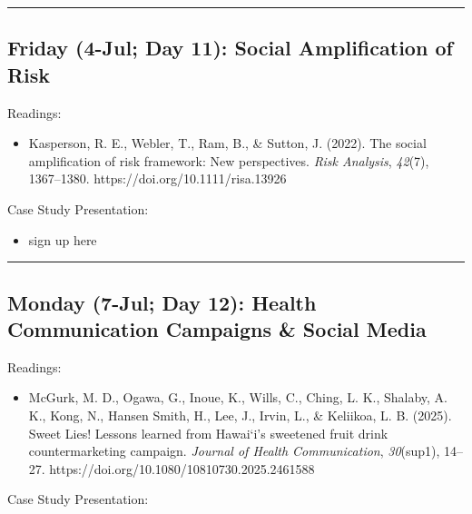 \documentclass[
  letterpaper,
]{article}
\providecommand{\tightlist}{%
  \setlength{\itemsep}{0pt}\setlength{\parskip}{0pt}}\usepackage{longtable,booktabs,array}
\begin{document}
\begin{center}\rule{0.5\linewidth}{0.5pt}\end{center}

\hypertarget{friday-4-jul-day-11-social-amplification-of-risk}{%
\subsection{Friday (4-Jul; Day 11): Social Amplification of
Risk}\label{friday-4-jul-day-11-social-amplification-of-risk}}

Readings:

\begin{itemize}
\tightlist
\item
  Kasperson, R. E., Webler, T., Ram, B., \& Sutton, J. (2022). The
  social amplification of risk framework: New perspectives. \emph{Risk
  Analysis}, \emph{42}(7), 1367--1380.
  https://doi.org/10.1111/risa.13926
\end{itemize}

Case Study Presentation:

\begin{itemize}
\tightlist
\item
  sign up here
\end{itemize}

\begin{center}\rule{0.5\linewidth}{0.5pt}\end{center}

\hypertarget{monday-7-jul-day-12-health-communication-campaigns-social-media}{%
\subsection{Monday (7-Jul; Day 12): Health Communication Campaigns \&
Social
Media}\label{monday-7-jul-day-12-health-communication-campaigns-social-media}}

Readings:

\begin{itemize}
\tightlist
\item
  McGurk, M. D., Ogawa, G., Inoue, K., Wills, C., Ching, L. K., Shalaby,
  A. K., Kong, N., Hansen Smith, H., Lee, J., Irvin, L., \& Keliikoa, L.
  B. (2025). Sweet Lies! Lessons learned from Hawai`i's sweetened fruit
  drink countermarketing campaign. \emph{Journal of Health
  Communication}, \emph{30}(sup1), 14--27.
  https://doi.org/10.1080/10810730.2025.2461588
\end{itemize}

Case Study Presentation:
\end{document}
